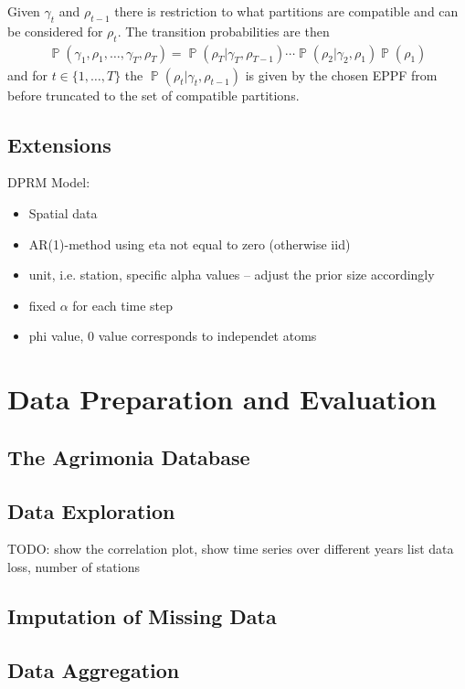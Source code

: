 \documentclass[12pt,a4paper]{article}
\DeclareMathOperator{\PP}{\mathbb{P}}
\begin{document}
Given $\gamma_t$ and $\rho_{t-1}$ there is restriction to what partitions are compatible and can be considered for $\rho_{t}$. The transition probabilities are then
\begin{align*}
    \PP(\gamma_1, \rho_1, \ldots, \gamma_T, \rho_T) = \PP(\rho_T\vert \gamma_T, \rho_{T-1})  \cdots  \PP(\rho_2\vert \gamma_2, \rho_{1}) \PP(\rho_1)
\end{align*}
and for $t \in \{1, \dots, T \}$ the $\PP(\rho_t\vert \gamma_t, \rho_{t-1})$ is given by the chosen EPPF from before truncated to the set of compatible partitions.

\subsection{Extensions}

DPRM Model:
\begin{itemize}
    \item Spatial data
    \item AR(1)-method using eta not equal to zero (otherwise iid)
    \item unit, i.e. station, specific alpha values -- adjust the prior size accordingly
    \item fixed $\alpha$ for each time step
    \item phi value, 0 value corresponds to independet atoms
\end{itemize}
\section{Data Preparation and Evaluation}


\subsection{The Agrimonia Database}

\subsection{Data Exploration}
TODO: show the correlation plot, show time series over different years
list data loss, number of stations

\subsection{Imputation of Missing Data}

\subsection{Data Aggregation}
\end{document}
